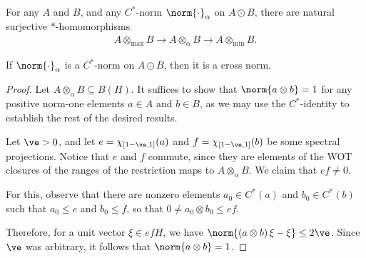 \documentclass[10pt]{mypackage}
\begin{document}
\begin{corollary}
  For any $A$ and $B$, and any $C^{\ast}$-norm $\norm{\cdot}_{\alpha}$ on $A\odot B$, there are natural surjective $\ast$-homomorphisms
  \begin{align*}
    A\otimes_{\max}B\rightarrow A\otimes_{\alpha}B\rightarrow A\otimes_{\min}B.
  \end{align*}
\end{corollary}
\begin{lemma}
  If $\norm{\cdot}_{\alpha}$ is a $C^{\ast}$-norm on $A\odot B$, then it is a cross norm.
\end{lemma}
\begin{proof}
  Let $A\otimes_{\alpha}B\subseteq B\left( H \right)$. It suffices to show that $\norm{a\otimes b} = 1$ for any positive norm-one elements $a\in A$ and $b\in B$, as we may use the $C^{\ast}$-identity to establish the rest of the desired results.

  Let $\ve > 0$, and let $e = \chi_{\left[ 1-\ve,1 \right]}(a)$ and $f = \chi_{\left[ 1-\ve,1 \right]}(b)$ be some spectral projections. Notice that $e$ and $f$ commute, since they are elements of the WOT closures of the ranges of the restriction maps to $A\otimes_{\alpha} B$. We claim that $ef\neq 0$.

  For this, observe that there are nonzero elements $a_0\in C^{\ast}\left( a \right)$ and $b_0\in C^{\ast}\left( b \right)$ such that $a_0\leq e$ and $b_0\leq f$, so that $0\neq a_0\otimes b_0\leq ef$.

  Therefore, for a unit vector $\xi\in ef H$, we have $\norm{\left( a\otimes b \right)\xi - \xi}\leq 2\ve$. Since $\ve$ was arbitrary, it follows that $\norm{a\otimes b} = 1$.
\end{proof}
\end{document}
